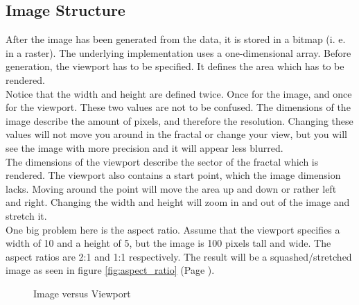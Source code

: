 \documentclass[10pt,a4paper,titlepage]{article}
\begin{document}
	\subsection{Image Structure}
	After the image has been generated from the data, it is stored in a bitmap (i. e. in a raster). The underlying implementation uses a one-dimensional array. Before generation, the viewport has to be specified. It defines the area which has to be rendered.\\
	Notice that the width and height are defined twice. Once for the image, and once for the viewport. These two values are not to be confused. The dimensions of the image describe the amount of pixels, and therefore the resolution. Changing these values will not move you around in the fractal or change your view, but you will see the image with more precision and it will appear less blurred.\\
	The dimensions of the viewport describe the sector of the fractal which is rendered. The viewport also contains a start point, which the image dimension lacks. Moving around the point will move the area up and down or rather left and right. Changing the width and height will zoom in and out of the image and stretch it.\\
	One big problem here is the aspect ratio. Assume that the viewport specifies a width of 10 and a height of 5, but the image is 100 pixels tall and wide. The aspect ratios are 2:1 and 1:1 respectively. The result will be a squashed/stretched image as seen in figure \ref{fig:aspect_ratio} (Page \pageref{fig:aspect_ratio}).
		\begin{figure}[h!]
		\centering
		\caption{Image versus Viewport}
		\label{fig:image_viewport}
	\end{figure}
\end{document}
